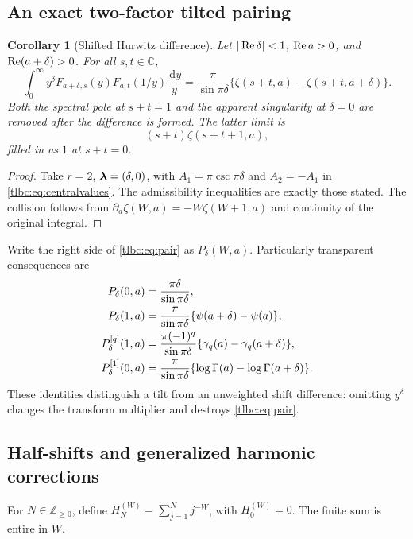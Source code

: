 \documentclass[11pt,letterpaper]{article}
\numberwithin{equation}{section}
\newtheorem{corollary}[theorem]{Corollary}
\theoremstyle{definition}\newtheorem{definition}[theorem]{Definition}
\theoremstyle{remark}\newtheorem{remark}[theorem]{Remark}
\newcommand{\C}{\mathbb C}\newcommand{\R}{\mathbb R}\newcommand{\Q}{\mathbb Q}\newcommand{\Z}{\mathbb Z}
\newcommand{\dd}{\,\mathrm d}\newcommand{\ii}{\mathrm i}
\begin{document}
\subsection{An exact two-factor tilted pairing}
\begin{corollary}[Shifted Hurwitz difference]\label{tlbc:cor:pair}
Let $|\operatorname{Re}\delta|<1$, $\operatorname{Re} a>0$, and $\operatorname{Re}(a+\delta)>0$. For all $s,t\in\C$,
\begin{equation}\label{tlbc:eq:pair}
 \boxed{\displaystyle
 \int_0^\infty y^\delta F_{a+\delta,s}(y)F_{a,t}(1/y)\frac{\dd y}{y}
 =\frac{\pi}{\sin\pi\delta}
       \{\zeta(s+t,a)-\zeta(s+t,a+\delta)\}.}
\end{equation}
Both the spectral pole at $s+t=1$ and the apparent singularity at $\delta=0$ are removed after the difference is formed. The latter limit is
\begin{equation}\label{tlbc:eq:paircollision}
 (s+t)\zeta(s+t+1,a),
\end{equation}
filled in as $1$ at $s+t=0$.
\end{corollary}
\begin{proof}
Take $r=2$, $\boldsymbol\lambda=(\delta,0)$, with $A_1=\pi\csc\pi\delta$ and $A_2=-A_1$ in \eqref{tlbc:eq:centralvalues}. The admissibility inequalities are exactly those stated. The collision follows from $\partial_a\zeta(W,a)=-W\zeta(W+1,a)$ and continuity of the original integral.
\end{proof}
Write the right side of \eqref{tlbc:eq:pair} as $P_\delta(W,a)$. Particularly transparent consequences are
\begin{align}
 P_\delta(0,a)&=\frac{\pi\delta}{\sin\pi\delta},\notag\\
 P_\delta(1,a)&=\frac{\pi}{\sin\pi\delta}\{\psi(a+\delta)-\psi(a)\},\notag\\
 P_\delta^{[q]}(1,a)&=\frac{\pi(-1)^q}{\sin\pi\delta}
                    \{\gamma_q(a)-\gamma_q(a+\delta)\},\notag\\
 P_\delta^{[1]}(0,a)&=\frac{\pi}{\sin\pi\delta}
                    \{\log\Gamma(a)-\log\Gamma(a+\delta)\}.
 \label{tlbc:eq:pairjets}
\end{align}
These identities distinguish a tilt from an unweighted shift difference: omitting $y^\delta$ changes the transform multiplier and destroys \eqref{tlbc:eq:pair}.

\subsection{Half-shifts and generalized harmonic corrections}
For $N\in\Z_{\ge0}$, define $H_N^{(W)}=\sum_{j=1}^N j^{-W}$, with $H_0^{(W)}=0$. The finite sum is entire in $W$.
\end{document}
